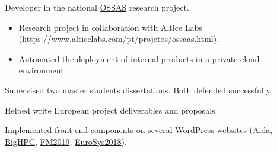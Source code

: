 \begin{cventries}
{\begin{cvitems}
        \item{Developer in the national \href{https://www.alticelabs.com/pt/projetos/ossaas.html}{OSSAS} research project.}
        \begin{itemize}
            \item Research project in collaboration with Altice Labs (\href{https://www.alticelabs.com/pt/projetos/ossaas.html}{https://www.alticelabs.com/pt/projetos/ossaas.html}).
            \item Automated the deployment of internal products in a private cloud environment.
        \end{itemize}
        \item{Supervised two master students dissertations. Both defended successfully.}
        \item{Helped write European project deliverables and proposals.}
        \item {Implemented front-end components on several WordPress websites (\href{https://aida.inesctec.pt}{Aida}, \href{https://bighpc.wavecom.pt}{BigHPC}, \href{http://formalmethods2019.inesctec.pt}{FM2019}, \href{https://eurosys2018.org}{EuroSys2018}).}
      \end{cvitems}
    }
\end{cventries}
